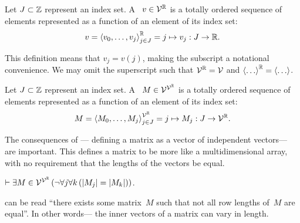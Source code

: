 \indexsym{}
\indexsym{}
\begin{definition}[Vector]
  Let $J\subset\mathbb{Z}$ represent an index set.
  A ~$v\in\mathcal{V}^{\mathbb{R}}$ is a totally ordered sequence of
   elements represented as a function of an element of its index set:
  \begin{equation}\label{vec}
    v = \left\langle v_0,\ldots,v_j\right\rangle^{\mathbb{R}}_{j\in J}
      = j \mapsto v_j : J \rightarrow \mathbb{R}.
  \end{equation}
\end{definition}

This definition means that $v_j = v(j)$,
  making the subscript a notational convenience.
We may omit the superscript such that $\mathcal{V}^{\mathbb{R}}=\mathcal{V}$
  and $\left\langle\ldots\right\rangle^{\mathbb{R}}=\left\langle\ldots\right\rangle$.

\begin{definition}[Matrix]
  Let $J\subset\mathbb{Z}$ represent an index set.
  A ~$M\in\mathcal{V}^{\mathcal{V}^{\mathbb{R}}}$ is a totally ordered sequence of
   elements represented as a function of an element of its index set:
  \begin{equation}
    M = \left\langle M_0,\ldots,M_j\right\rangle^{\mathcal{V}^{\mathbb{R}}}_{j\in J}
      = j \mapsto M_j : J \rightarrow \mathcal{V}^{\mathbb{R}}.
  \end{equation}
\end{definition}

The consequences of ---%
  defining a matrix as a vector of independent vectors---%
  are important.
This defines a matrix to be more like a multidimensional array,
  with no requirement that the lengths of the vectors be equal.

\begin{corollary}
  $\infer \Exists{M\in\Matrices}{\neg\Forall*{j}{\Forall{k}{\len{M_j} = \len{M_k}}}}$.
\end{corollary}

 can be read ``there exists some matrix~$M$ such that
  not all row lengths of~$M$ are equal''.
In other words---%
  the inner vectors of a matrix can vary in length.


